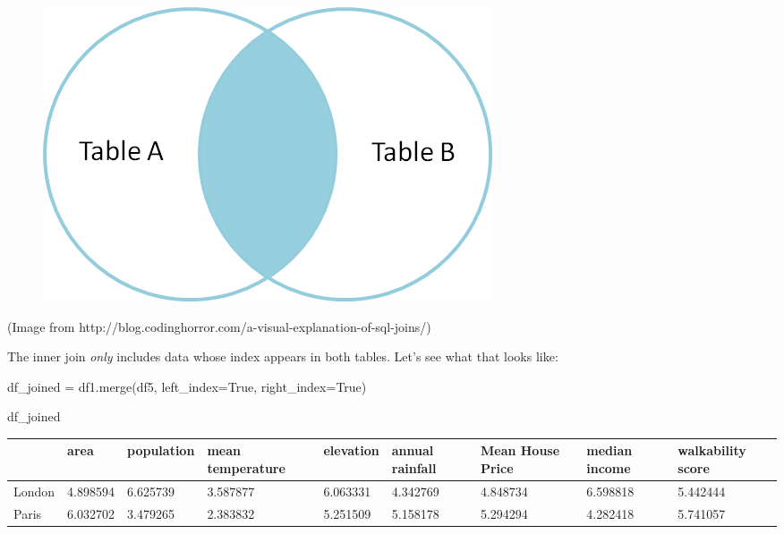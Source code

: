 \documentclass[
  letterpaper,
  DIV=11,
  numbers=noendperiod]{scrreprt}
\newenvironment{Shaded}{\begin{snugshade}}{\end{snugshade}}
\newcommand{\NormalTok}[1]{\textcolor[rgb]{0.00,0.23,0.31}{#1}}
\newcommand{\OperatorTok}[1]{\textcolor[rgb]{0.37,0.37,0.37}{#1}}
\newcommand{\VariableTok}[1]{\textcolor[rgb]{0.07,0.07,0.07}{#1}}
\begin{document}
\begin{figure}[H]

{\centering \includegraphics{notebooks/W06. Merging and Joining_files/figure-pdf/cell-33-output-1.png}

}

\end{figure}

(Image from
http://blog.codinghorror.com/a-visual-explanation-of-sql-joins/)

The inner join \emph{only} includes data whose index appears in both
tables. Let's see what that looks like:

\begin{Shaded}
\begin{Highlighting}[]
\NormalTok{df\_joined }\OperatorTok{=}\NormalTok{ df1.merge(df5, left\_index}\OperatorTok{=}\VariableTok{True}\NormalTok{, right\_index}\OperatorTok{=}\VariableTok{True}\NormalTok{)}
\end{Highlighting}
\end{Shaded}

\begin{Shaded}
\begin{Highlighting}[]
\NormalTok{df\_joined}
\end{Highlighting}
\end{Shaded}

\begin{longtable}[]{@{}lllllllll@{}}
\toprule\noalign{}
& area & population & mean temperature & elevation & annual rainfall &
Mean House Price & median income & walkability score \\
\midrule\noalign{}
\endhead
\bottomrule\noalign{}
\endlastfoot
London & 4.898594 & 6.625739 & 3.587877 & 6.063331 & 4.342769 & 4.848734
& 6.598818 & 5.442444 \\
Paris & 6.032702 & 3.479265 & 2.383832 & 5.251509 & 5.158178 & 5.294294
& 4.282418 & 5.741057 \\
\end{longtable}
\end{document}
